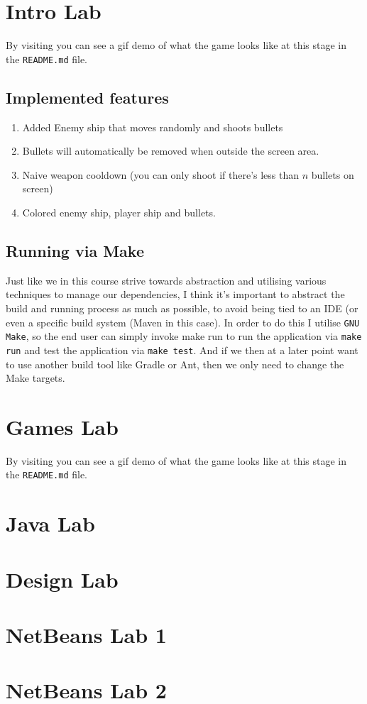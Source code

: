 \section{Intro Lab}
By visiting  you can see a gif demo of what
the game looks like at this stage in the \texttt{README.md} file.

\subsection{Implemented features}
\begin{enumerate}
        \item Added Enemy ship that moves randomly and shoots bullets
        \item Bullets will automatically be removed when outside the screen area.
        \item Naive weapon cooldown\: (you can only shoot if there's less than $n$ bullets on screen)
        \item Colored enemy ship, player ship and bullets.
\end{enumerate}

\subsection{Running via Make}
Just like we in this course strive towards abstraction and utilising various
techniques to manage our dependencies, I think it's important to abstract the build and
running process as much as possible, to avoid being tied to an IDE (or even a
specific build system (Maven in this case). In order to do this I utilise \texttt{GNU
Make}, so the end user can simply invoke make run to run the
application via \texttt{make run} and test the application via \texttt{make test}.
And if we then at a later point want to use another build tool like Gradle or Ant,
then we only need to change the Make targets.

\section{Games Lab}
By visiting  you can see a gif demo of what
the game looks like at this stage in the \texttt{README.md} file.

\section{Java Lab}

\section{Design Lab}

\section{NetBeans Lab 1}

\section{NetBeans Lab 2}
